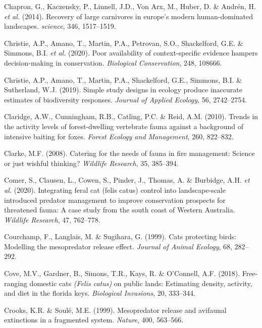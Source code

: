 \documentclass[11pt,a4paper,titlepage,twoside,openright]{style/unimelbthesis}
\begin{document}
\begin{mainmatter}
\leavevmode\hypertarget{ref-chapron2014recovery}{}%
Chapron, G., Kaczensky, P., Linnell, J.D., Von Arx, M., Huber, D. \& Andrén, H. \emph{et al.} (2014). Recovery of large carnivores in europe's modern human-dominated landscapes. \emph{science}, 346, 1517--1519.

\leavevmode\hypertarget{ref-christie2020poor}{}%
Christie, A.P., Amano, T., Martin, P.A., Petrovan, S.O., Shackelford, G.E. \& Simmons, B.I. \emph{et al.} (2020). Poor availability of context-specific evidence hampers decision-making in conservation. \emph{Biological Conservation}, 248, 108666.

\leavevmode\hypertarget{ref-christie2019simple}{}%
Christie, A.P., Amano, T., Martin, P.A., Shackelford, G.E., Simmons, B.I. \& Sutherland, W.J. (2019). Simple study designs in ecology produce inaccurate estimates of biodiversity responses. \emph{Journal of Applied Ecology}, 56, 2742--2754.

\leavevmode\hypertarget{ref-claridge2010trends}{}%
Claridge, A.W., Cunningham, R.B., Catling, P.C. \& Reid, A.M. (2010). Trends in the activity levels of forest-dwelling vertebrate fauna against a background of intensive baiting for foxes. \emph{Forest Ecology and Management}, 260, 822--832.

\leavevmode\hypertarget{ref-clarke2008catering}{}%
Clarke, M.F. (2008). Catering for the needs of fauna in fire management: Science or just wishful thinking? \emph{Wildlife Research}, 35, 385--394.

\leavevmode\hypertarget{ref-comer2020integrating}{}%
Comer, S., Clausen, L., Cowen, S., Pinder, J., Thomas, A. \& Burbidge, A.H. \emph{et al.} (2020). Integrating feral cat (felis catus) control into landscape-scale introduced predator management to improve conservation prospects for threatened fauna: A case study from the south coast of Western Australia. \emph{Wildlife Research}, 47, 762--778.

\leavevmode\hypertarget{ref-courchamp1999cats}{}%
Courchamp, F., Langlais, M. \& Sugihara, G. (1999). Cats protecting birds: Modelling the mesopredator release effect. \emph{Journal of Animal Ecology}, 68, 282--292.

\leavevmode\hypertarget{ref-cove2018free}{}%
Cove, M.V., Gardner, B., Simons, T.R., Kays, R. \& O'Connell, A.F. (2018). Free-ranging domestic cats \emph{(Felis catus)} on public lands: Estimating density, activity, and diet in the florida keys. \emph{Biological Invasions}, 20, 333--344.

\leavevmode\hypertarget{ref-crooks1999mesopredator}{}%
Crooks, K.R. \& Soulé, M.E. (1999). Mesopredator release and avifaunal extinctions in a fragmented system. \emph{Nature}, 400, 563--566.


\end{mainmatter}
\end{document}
